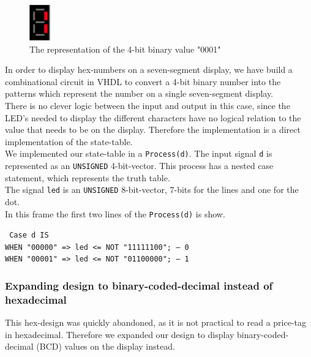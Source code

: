 \begin{figure}[!h]
\centering
\includegraphics[scale=0.5]{figs/single_digit_1.png} 
\caption{The representation of the 4-bit binary value "0001"}
\label{fig:single_digit_1}
\end{figure}

In order to display hex-numbers on a seven-segment display, we have build a combinational circuit in VHDL to convert a 4-bit binary number into the patterns which represent the number on a single seven-segment display. \\

There is no clever logic between the input and output in this case, since the LED's needed to display the different characters have no logical relation to the value that needs to be on the display. 
Therefore the implementation is a direct implementation of the state-table. \\

We implemented our state-table in a \texttt{Process(d)}. The input signal \texttt{d} is represented as an \texttt{UNSIGNED} 4-bit-vector. This process has a nested case statement, which represents the truth table. \\

The signal \texttt{led} is an \texttt{UNSIGNED} 8-bit-vector, 7-bits for the lines and one for the dot. \\

In this frame the first two lines of the \texttt{Process(d)} is show.
\begin{framed}
\texttt{
Case d IS \\
	WHEN "00000" => led <= NOT "11111100"; -- 0 \\
	WHEN "00001" => led <= NOT "01100000"; -- 1 \\
}
\end{framed}

\subsubsection{Expanding design to binary-coded-decimal instead of hexadecimal}
This hex-design was quickly abandoned, as it is not practical to read a price-tag in hexadecimal. Therefore we expanded our design to display binary-coded-decimal (BCD) values on the display instead. \\

